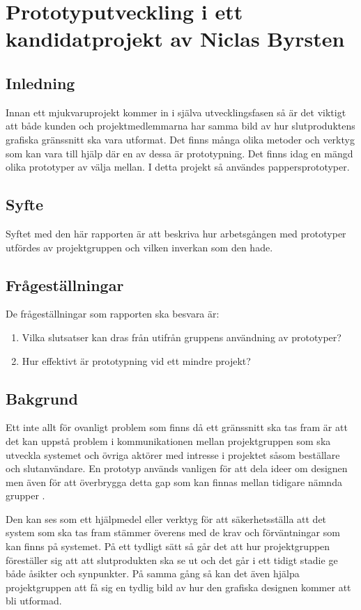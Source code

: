 \chapter{Prototyputveckling i ett kandidatprojekt av Niclas Byrsten}\label{appendix:prototyp}

\section{Inledning}
Innan ett mjukvaruprojekt kommer in i själva utvecklingsfasen så är det viktigt att både kunden och projektmedlemmarna har samma bild av hur slutproduktens grafiska gränssnitt ska vara utformat. Det finns många olika metoder och verktyg som kan vara till hjälp där en av dessa är prototypning. Det finns idag en mängd olika prototyper av välja mellan. I detta projekt så användes pappersprototyper.  

\section{Syfte}
Syftet med den här rapporten är att beskriva hur arbetsgången med prototyper utfördes av projektgruppen och vilken inverkan som den hade.
\section{Frågeställningar}
De frågeställningar som rapporten ska besvara är:
\begin{enumerate}
    \item Vilka slutsatser kan dras från utifrån gruppens användning av prototyper? 
    \item Hur effektivt är prototypning vid ett mindre projekt?
\end{enumerate}

\section{Bakgrund}
Ett inte allt för ovanligt problem som finns då ett gränssnitt ska tas fram är att det kan uppstå problem i kommunikationen mellan projektgruppen som ska utveckla systemet och övriga aktörer med intresse i projektet såsom beställare och slutanvändare. En prototyp används vanligen för att dela ideer om designen men även för att överbrygga detta gap som kan finnas mellan tidigare nämnda grupper \cite{caseStudy}. 

Den kan ses som ett hjälpmedel eller verktyg för att säkerhetsställa att det system som ska tas fram stämmer överens med de krav och förväntningar som kan finns på systemet. På ett tydligt sätt så går det att hur projektgruppen föreställer sig att att slutprodukten ska se ut och det går i ett tidigt stadie ge både åsikter och synpunkter. På samma gång så kan det även hjälpa projektgruppen att få sig en tydlig bild av hur den grafiska designen kommer att bli utformad. 

